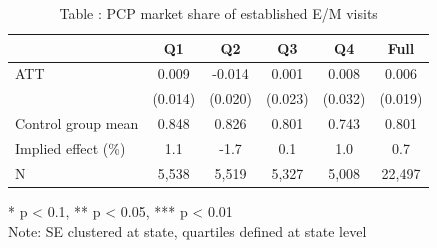 \begin{table}[t]
\caption*{
{\fontsize{20}{25}\selectfont  Table : PCP market share of established E/M visits\fontsize{12}{15}\selectfont }
} 
\fontsize{12.0pt}{14.0pt}\selectfont
\begin{tabular*}{\linewidth}{@{\extracolsep{\fill}}lccccc}
\toprule
  & Q1 & Q2 & Q3 & Q4 & Full \\ 
\midrule\addlinespace[2.5pt]
ATT & 0.009 & -0.014 & 0.001 & 0.008 & 0.006 \\ 
 & (0.014) & (0.020) & (0.023) & (0.032) & (0.019) \\ 
Control group mean & 0.848 & 0.826 & 0.801 & 0.743 & 0.801 \\ 
Implied effect (\%) & 1.1 & -1.7 & 0.1 & 1.0 & 0.7 \\ 
N & 5,538 & 5,519 & 5,327 & 5,008 & 22,497 \\ 
\bottomrule
\end{tabular*}
\begin{minipage}{\linewidth}
* p < 0.1, ** p < 0.05, *** p < 0.01\\
Note: SE clustered at state, quartiles defined at state level\\
\end{minipage}
\end{table}

